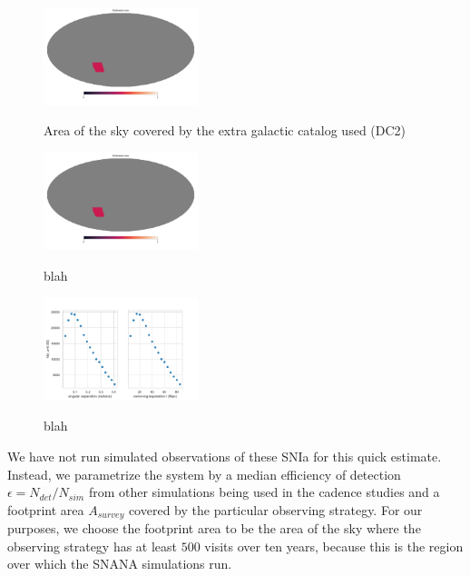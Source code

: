 \begin{figure}
    \begin{center}
        {\includegraphics[width=0.4\textwidth]{figures/catalog_area}}
        \caption{Area of the sky covered by the extra galactic catalog used (DC2)}
    \end{center}
    \label{fig:catalog_area}
\end{figure}

\begin{figure}
    \begin{center}
        {\includegraphics[width=0.4\textwidth]{figures/catalog_area}}
        \caption{blah}
    \end{center}
    \label{tab:sep_pairs}
\end{figure}
\begin{figure}
    \begin{center}
        {\includegraphics[width=0.4\textwidth]{figures/NumberPairsatDistance_z0p05}}
        \caption{blah}
    \end{center}
    \label{fig:num_pairs_cat}
\end{figure}
We have not run simulated observations of these SNIa for this quick estimate. Instead, we parametrize the system by a median efficiency of detection $\epsilon = N_{det} / N_{sim} $ from other simulations being used in the cadence studies and a footprint area $A_{survey}$ covered by the particular observing strategy. For our purposes, we choose the footprint area to be the area of the sky where the observing strategy has at least $500$ visits over ten years, because this is the region over which the SNANA simulations run.
